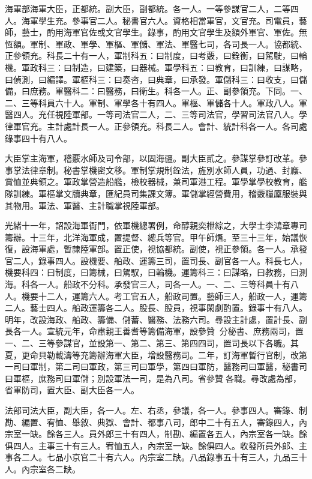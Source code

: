 \begin{pinyinscope}
海軍部海軍大臣，正都統。副大臣，副都統。各一人。一等參謀官二人，二等四人。海軍學生充。參事官二人。秘書官六人。資格相當軍官，文官充。司電員，藝師，藝士，酌用海軍官佐或文官學生。錄事，酌用文官學生及額外軍官、軍佐。無恆額。軍制、軍政、軍學、軍樞、軍儲、軍法、軍醫七司，各司長一人。協都統、正參領充。科長二十有一人，軍制科五：曰制度，曰考覈，曰銓衡，曰駕駛，曰輪機。軍政科三：曰制造，曰建築，曰器械。軍學科五：曰教育，曰訓練，曰謀略，曰偵測，曰編譯。軍樞科三：曰奏咨，曰典章，曰承發。軍儲科三：曰收支，曰儲備，曰庶務。軍醫科二：曰醫務，曰衛生。科各一人。正、副參領充。下同。一、二、三等科員六十人。軍制、軍學各十有四人。軍樞、軍儲各十人。軍政八人。軍醫四人。充任視陸軍部。一等司法官二人，二、三等司法官，學習司法官八人。學律軍官充。主計處計長一人。正參領充。科長二人。會計、統計科各一人。各司處錄事四十有八人。

大臣掌主海軍，稽覈水師及司令部，以固海疆。副大臣貳之。參謀掌參訂改革。參事掌法律章制。秘書掌機密文移。軍制掌規制銓法，旌別水師人員，功過、封廕、賞恤並典領之。軍政掌營造船艦，檢校器械，兼司軍港工程。軍學掌學校教育，艦隊訓練。軍樞掌文牘典章，匯紀員司集課文簿。軍儲掌經營費用，稽覈糧廩服裝與其物用。軍法、軍醫、主計職掌視陸軍部。

光緒十一年，詔設海軍衙門，依軍機總署例，命醇親奕枻綜之，大學士李鴻章專司籌辦。十三年，北洋海軍成，置提督、總兵等官。甲午師熸。至三十三年，始議恢復，設海軍處，暫隸陸軍部。置正使，視協都統。副使，視正參領。各一人。承發官二人，錄事四人。設機要、船政、運籌三司，置司長、副官各一人。科長七人，機要科四：曰制度，曰籌械，曰駕馭，曰輪機。運籌科三：曰謀略，曰教務，曰測海。科各一人。船政不分科。承發官三人，司各一人。一、二、三等科員十有八人。機要十二人，運籌六人。考工官五人，船政司置。藝師三人，船政一人，運籌二人。藝士四人。船政運籌各二人。股長、股員，視事閑劇酌置。錄事十有八人。明年，改設海政、船政、籌備、儲蓄、醫務、法務六司。尋設主計處，置計長、副長各一人。宣統元年，命肅親王善耆等籌備海軍，設參贊，分秘書、庶務兩司，置一、二、三等參謀官，並設第一、第二、第三、第四四司，置司長以下各職。其夏，更命貝勒載濤等充籌辦海軍大臣，增設醫務司。二年，訂海軍暫行官制，改第一司曰軍制，第二司曰軍政，第三司曰軍學，第四曰軍防，醫務司曰軍醫，秘書司曰軍樞，庶務司曰軍儲；別設軍法一司，是為八司。省參贊各職。尋改處為部，省軍防司，置大臣、副大臣各一人。

法部司法大臣，副大臣，各一人。左、右丞，參議，各一人。參事四人。審錄、制勘、編置、宥恤、舉敘、典獄、會計、都事八司，郎中二十有五人，審錄四人，內宗室一缺。餘各三人。員外郎三十有四人，制勘、編置各五人，內宗室各一缺。餘俱四人。主事三十有三人。宥恤五人，內宗室一缺。餘俱四人。收發所員外郎、主事各二人。七品小京官二十有六人。內宗室二缺。八品錄事五十有三人，九品三十人。內宗室各二缺。


\end{pinyinscope}
